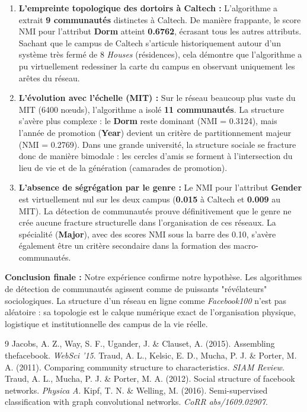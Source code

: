 \documentclass[a4paper,11pt]{article}
\begin{document}
\begin{enumerate}
    \item \textbf{L'empreinte topologique des dortoirs à Caltech :} L'algorithme a extrait \textbf{9 communautés} distinctes à Caltech. De manière frappante, le score NMI pour l'attribut \textbf{Dorm} atteint \textbf{0.6762}, écrasant tous les autres attributs. Sachant que le campus de Caltech s'articule historiquement autour d'un système très fermé de 8 \textit{Houses} (résidences), cela démontre que l'algorithme a pu virtuellement redessiner la carte du campus en observant uniquement les arêtes du réseau.
    \item \textbf{L'évolution avec l'échelle (MIT) :} Sur le réseau beaucoup plus vaste du MIT (6400 nœuds), l'algorithme a isolé \textbf{11 communautés}. La structure s'avère plus complexe : le \textbf{Dorm} reste dominant (NMI = 0.3124), mais l'année de promotion (\textbf{Year}) devient un critère de partitionnement majeur (NMI = 0.2769). Dans une grande université, la structure sociale se fracture donc de manière bimodale : les cercles d'amis se forment à l'intersection du lieu de vie et de la génération (camarades de promotion).
    \item \textbf{L'absence de ségrégation par le genre :} Le NMI pour l'attribut \textbf{Gender} est virtuellement nul sur les deux campus (\textbf{0.015} à Caltech et \textbf{0.009} au MIT). La détection de communautés prouve définitivement que le genre ne crée aucune fracture structurelle dans l'organisation de ces réseaux. La spécialité (\textbf{Major}), avec des scores NMI sous la barre des 0.10, s'avère également être un critère secondaire dans la formation des macro-communautés.
\end{enumerate}

\textbf{Conclusion finale :} Notre expérience confirme notre hypothèse. Les algorithmes de détection de communautés agissent comme de puissants "révélateurs" sociologiques. La structure d'un réseau en ligne comme \textit{Facebook100} n'est pas aléatoire : sa topologie est le calque numérique exact de l'organisation physique, logistique et institutionnelle des campus de la vie réelle.

\begin{thebibliography}{9}
 Jacobs, A. Z., Way, S. F., Ugander, J. \& Clauset, A. (2015). Assembling thefacebook. \textit{WebSci '15}. 
 Traud, A. L., Kelsic, E. D., Mucha, P. J. \& Porter, M. A. (2011). Comparing community structure to characteristics. \textit{SIAM Review}. 
 Traud, A. L., Mucha, P. J. \& Porter, M. A. (2012). Social structure of facebook networks. \textit{Physica A}. 
 Kipf, T. N. \& Welling, M. (2016). Semi-supervised classification with graph convolutional networks. \textit{CoRR abs/1609.02907}.
\end{thebibliography}
\end{document}
